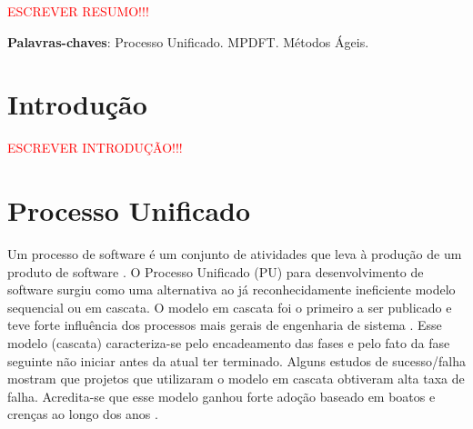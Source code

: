 \documentclass[
	article,			%
	11pt,				%
	oneside,			%
	a4paper,			%
	english,			%
	brazil,				%
	sumario=tradicional
	]{abntex2}
\begin{document}
\frenchspacing 


%
%
\maketitle

\begin{resumoumacoluna}

   \textcolor{red}{ESCREVER RESUMO!!!}

   \vspace{\onelineskip}

   \noindent
   \textbf{Palavras-chaves}: Processo Unificado. MPDFT. Métodos Ágeis.
\end{resumoumacoluna}


\textual

\section*{Introdução}

\textcolor{red}{ESCREVER INTRODUÇÃO!!!}

\section{Processo Unificado}

Um processo de software é um conjunto de atividades que leva à produção de um
produto de software \cite{sommerville2007}. O Processo Unificado (PU)
\cite{jacobson1999unified} para desenvolvimento de software surgiu como uma
alternativa ao já reconhecidamente ineficiente modelo sequencial ou em cascata.
O modelo em cascata foi o primeiro a ser publicado e teve forte influência dos
processos mais gerais de engenharia de sistema \cite{sommerville2007}. Esse
modelo (cascata) caracteriza-se pelo encadeamento das fases e pelo fato da fase
seguinte não iniciar antes da atual ter terminado. Alguns estudos de
sucesso/falha mostram que projetos que utilizaram o modelo em cascata obtiveram
alta taxa de falha. Acredita-se que esse modelo ganhou forte adoção baseado em
boatos e crenças ao longo dos anos \cite{larman2007utilizando}.
\end{document}
